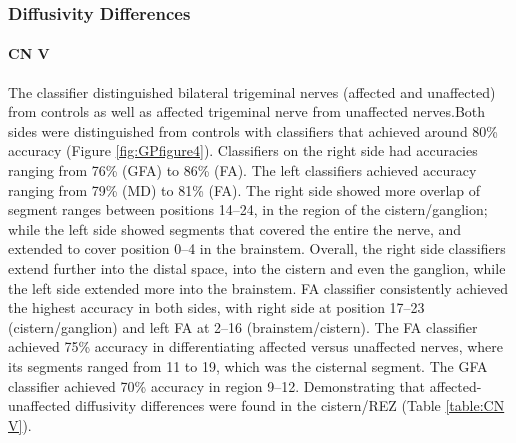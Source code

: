 \subsubsection{Diffusivity Differences}
\paragraph{CN V}
The classifier distinguished bilateral trigeminal nerves (affected and unaffected) from controls as well as affected trigeminal nerve from unaffected nerves.Both sides were distinguished from controls with classifiers that achieved around 80\% accuracy (Figure \ref{fig:GPfigure4}). 
Classifiers on the right side had accuracies ranging from 76\% (GFA) to 86\% (FA). The left classifiers achieved accuracy ranging from 79\% (MD) to 81\% (FA). The right side showed more overlap of segment ranges between positions 14--24, in the region of the cistern/ganglion; while the left side showed segments that covered the entire the nerve, and extended to cover position 0--4 in the brainstem. Overall, the right side classifiers extend further into the distal space, into the cistern and even the ganglion, while the left side extended more into the brainstem. FA classifier consistently achieved the highest accuracy in both sides, with right side at position 17--23 (cistern/ganglion) and left FA at 2--16 (brainstem/cistern).
The FA classifier achieved 75\% accuracy in differentiating affected versus unaffected nerves, where its segments ranged from 11 to 19, which was the cisternal segment. The GFA classifier achieved 70\% accuracy in region 9--12. Demonstrating that affected-unaffected diffusivity differences were found in the cistern/REZ (Table \ref{table:CN V}).

